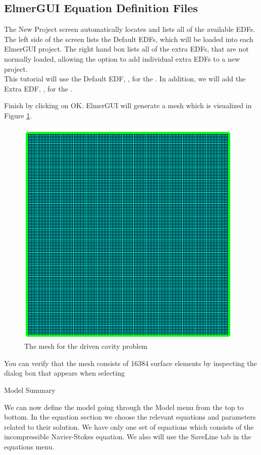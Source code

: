 \subsection*{ElmerGUI Equation Definition Files}

The New Project screen automatically locates and lists all of the available EDFs.  The left side of the screen lists the Default EDFs, which will be loaded into each ElmerGUI project.  The right hand box lists all of the extra EDFs, that are not normally loaded, allowing the option to add individual extra EDFs to a new project.\\

This tutorial will use the Default EDF, \texttt{}, for the .  In addition, we will add the Extra EDF,  \texttt{}, for the .

Finish by clicking on OK.  ElmerGUI will generate a mesh which is visualized in Figure \ref{fg:DC_mesh}.

\begin{figure}[H]
\centering
\includegraphics[scale=0.6]{DC_mesh}
\caption{The mesh for the driven cavity problem}\label{fg:DC_mesh}
\end{figure}

You can verify that the mesh consists of 16384 surface elements by inspecting the dialog box that appears when selecting

\ttbegin
Model
  Summary
\ttend

We can now define the model going through the Model menu from the top to bottom.  
In the equation section we choose the relevant equations and parameters related to their solution. 
We have only one set of equations which consists of the incompressible Navier-Stokes equation.
We also will use the SaveLine tab in the equations menu.

